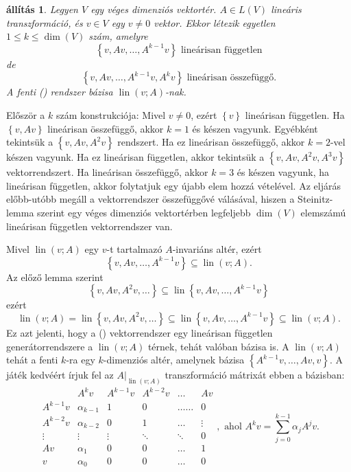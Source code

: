 \documentclass[a4paper, showtrims]{memoir}
\makeatletter
\renewenvironment{proof}[1][\proofname]
    {\par\pushQED{\qed}%
    \normalfont \topsep6\p@\@plus6\p@\relax
    \trivlist
    \item[\hskip\labelsep
        \itshape
    #1\@addpunct{:}]\ignorespaces}
    {\popQED\endtrivlist\@endpefalse}
\theoremstyle{plain}
\newtheorem{proposition}{állítás}[chapter]
\theoremstyle{remark}
\theoremstyle{definition}
\DeclareMathOperator{\lin}{lin}
\makeatother
\begin{document}
\begin{proposition}
	Legyen $V$ egy véges dimenziós vektortér.
	$A\in L\left( V \right)$ lineáris transzformáció,
	és $v\in V$ egy $v\neq 0$ vektor.
	Ekkor létezik egyetlen $1\leq k\leq \dim(V)$ szám,
	amelyre
	\[
		\left\{ v,Av,\ldots,A^{k-1}v \right\} \text{ lineárisan független}\tag{\dag}
	\]
	de
	\[
		\left\{ v,Av,\ldots,A^{k-1}v, A^kv \right\} \text{ lineárisan összefüggő.}\tag{\ddag}
	\]
	A fenti (\dag) rendszer bázisa $\lin\left( v;A \right)$-nak.
\end{proposition}
\begin{proof}
	Először a $k$ szám konstrukciója:
	Mivel $v\neq 0$, ezért $\left\{ v \right\}$ lineárisan független.
	Ha $\left\{ v,Av \right\}$ lineárisan összefüggő,
	akkor $k=1$ és készen vagyunk.
	Egyébként tekintsük a $\left\{ v,Av,A^2v \right\}$ rendszert.
	Ha ez lineárisan összefüggő, akkor $k=2$-vel készen vagyunk.
	Ha ez lineárisan független, akkor tekintsük a
	$\left\{ v,Av,A^2v,A^3v \right\}$ vektorrendszert.
	Ha lineárisan összefüggő, akkor $k=3$ és készen vagyunk,
	ha lineárisan független, akkor folytatjuk egy újabb elem hozzá vételével.
	Az eljárás előbb-utóbb megáll a vektorrendszer összefüggővé válásával,
	hiszen a Steinitz-lemma  szerint egy véges dimenziós vektortérben legfeljebb
	$\dim(V)$ elemszámú lineárisan független vektorrendszer van.

	Mivel $\lin\left( v;A \right)$ egy $v$-t tartalmazó $A$-invariáns altér,
	ezért
	\[
		\left\{ v,Av,\ldots,A^{k-1}v \right\}
		\subseteq
		\lin\left( v;A \right).
	\]
	Az előző lemma szerint
	\[
		\left\{ v,Av,A^2v,\dots \right\}
		\subseteq
		\lin\left\{ v,Av,\ldots,A^{k-1}v \right\}
	\]
	ezért
	\[
		\lin\left( v;A \right)
		=
		\lin\left\{ v,Av,A^2v,\dots \right\}
		\subseteq
		\lin\left\{ v,Av,\ldots,A^{k-1}v \right\}
		\subseteq
		\lin\left( v;A \right).
	\]
	Ez azt jelenti, hogy a (\dag) vektorrendszer egy lineárisan független generátorrendszere
	a $\lin\left( v;A \right)$ térnek, tehát valóban bázisa is.
\end{proof}
A $\lin\left( v;A \right)$ tehát a fenti $k$-ra egy $k$-dimenziós altér,
amelynek bázisa $\left\{A^{k-1}v,\ldots,Av,v \right\}$.
A játék kedvéért írjuk fel az $A|_{\lin\left( v;A \right)}$ transzformáció mátrixát
ebben a bázisban:\label{ar:elsomegjelenes}
\[
	\begin{array}{r|ccccc}
		         & A^kv         & A^{k-1}v & A^{k-2}v & \dots      & Av     \\
		\hline
		A^{k-1}v & \alpha_{k-1} & 1        & 0        & \dots\dots & 0      \\
		A^{k-2}v & \alpha_{k-2} & 0        & 1        & \dots      & \vdots \\
		\vdots   & \vdots       & \vdots   & \ddots   & \ddots     & 0      \\
		Av       & \alpha_1     & 0        & 0        & \dots      & 1      \\
		v        & \alpha_0     & 0        & 0        & \dots      & 0
	\end{array},
	\text{ ahol }A^kv=\sum_{j=0}^{k-1}\alpha_jA^jv.
\]
\end{document}
